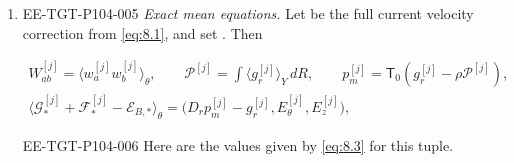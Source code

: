 \begin{proposition}
\begin{enumerate}[label=(\roman*)]
\item \begin{EESegment}{EE-TGT-P104-005}
\emph{Exact mean equations.} Let
 be the full current velocity
correction from \eqref{eq:8.1}, and set
. Then
\end{EESegment}
\begin{equation}
\begin{gathered}
W_{ab}^{[j]}=\langle w_a^{[j]}w_b^{[j]}\rangle_\theta,
\qquad
\mathcal P^{[j]}=\int\langle g_r^{[j]}\rangle_Y\,dR,
\qquad
p_m^{[j]}=\mathsf T_0(g_r^{[j]}-\rho\mathcal P^{[j]}),\\
\langle\mathcal G_*^{[j]}+\mathcal F_*^{[j]}-\mathcal E_{B,*}\rangle_\theta
=\bigl(D_r p_m^{[j]}-g_r^{[j]},E_\theta^{[j]},E_z^{[j]}\bigr),
\end{gathered}
\tag{9.6}\label{eq:9.6}
\end{equation}
\begin{EESegment}{EE-TGT-P104-006}
Here  are the values given by
\eqref{eq:8.3} for this tuple.
\end{EESegment}
\end{enumerate}
\end{proposition}

